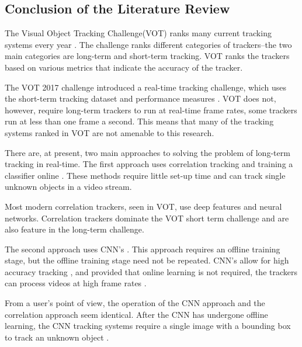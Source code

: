   \subsection{Conclusion of the Literature Review}
    The Visual Object Tracking Challenge(VOT) ranks many current tracking systems every year \cite{VOT2017, Kristan2020a}.
    The challenge ranks different categories of trackers--the two main categories are long-term and short-term tracking.
    VOT ranks the trackers based on various metrics that indicate the accuracy of the tracker. 

    The VOT 2017 challenge introduced a real-time tracking challenge, which uses the short-term tracking dataset and performance measures \cite{Kristan2020a}.
    VOT does not, however, require long-term trackers to run at real-time frame rates, some trackers run at less than one frame a second.
    This means that many of the tracking systems ranked in VOT are not amenable to this research.

    There are, at present, two main approaches to solving the problem of long-term tracking in real-time.
    The first approach uses correlation tracking and training a classifier online \cite{Ma2015Correlation, Enriques2014, Kalal2011}.
    These methods require little set-up time and can track single unknown objects in a video stream.
    
    Most modern correlation trackers, seen in VOT, use deep features and neural networks.
    Correlation trackers dominate the VOT short term challenge and are also feature in the long-term challenge.

    The second approach uses CNN's \cite{bertinetto2016}.
    This approach requires an offline training stage, but the offline training stage need not be repeated.
    CNN's allow for high accuracy tracking \cite{CNNTracking, bertinetto2016}, and provided that online learning is not required, the trackers can process videos at high frame rates \cite{Kristan2020a}.

    From a user's point of view, the operation of the CNN approach and the correlation approach seem identical.
    After the CNN has undergone offline learning, the CNN tracking systems require a single image with a bounding box to track an unknown object \cite{CNNTracking, bertinetto2016}.

